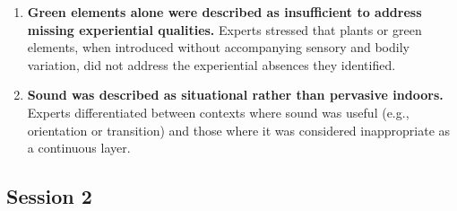 \begin{enumerate}
\item \textbf{Green elements alone were described as insufficient to address missing experiential qualities.}  Experts stressed that plants or green elements, when introduced without accompanying sensory and bodily variation, did not address the experiential absences they identified.

\item \textbf{Sound was described as situational rather than pervasive indoors.}  Experts differentiated between contexts where sound was useful (e.g., orientation or transition) and those where it was considered inappropriate as a continuous layer.
\end{enumerate}



\subsection{Session 2}
\label{apx-s2}
